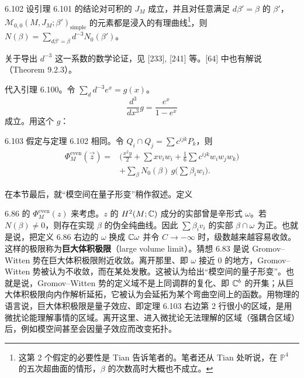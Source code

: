 \begin{theorem}{6.102}
  设引理 6.101 的结论对可积的 $J_M$ 成立，并且对任意满足 $d\beta'=\beta$ 的 $\beta'$，$\mathcal{M}_{0,0}(M,J_M;\beta')_{\mathrm{simple}}$ 的元素都是浸入的有理曲线\footnote{这第 2 个假定的必要性是 Tian 告诉笔者的。笔者还从 Tian 处听说，在 $\mathbb{P}^4$ 的五次超曲面的情形，$\beta$ 的次数高时大概也不成立。}，则 $N(\beta)=\sum_{d\beta'=\beta}d^{-3}N_0(\beta')$。
\end{theorem}

关于导出 $d^{-3}$ 这一系数的数学论证，见 [233], [241] 等。[64] 中也有解说（Theorem 9.2.3）。

代入引理 6.100。令 $\sum_d d^{-3}e^x=g(x)$。
\[
  \frac{d^3}{dx^3}g=\frac{e^x}{1-e^x}
\]
成立。用这个 $g$：

\begin{theorem}{6.103}
  假定与定理 6.102 相同。令 $Q_i\cap Q_j=\sum c^{ijk}P_k$，则
  \[
  \begin{aligned}
    \Phi_M^{\mathrm{even}}(\vec z)
    ={}&\Big(\frac{x^2y}{2}+\sum xv_iw_i+\frac16\sum c^{ijk}w_iw_jw_k\Big)\\
    &+\sum_\beta N_0(\beta)\,g\Big(\sum\beta_iw_i\Big).
  \end{aligned}
  \]
\end{theorem}


在本节最后，就“模空间在量子形变”稍作叙述。定义

6.86 的 $\Phi_M^{\mathrm{even}}(z)$ 来考虑。$z$ 的 $H^2(M;\mathbb{C})$ 成分的实部曾是辛形式 $\omega$。若 $N(\beta)\ne0$，则存在实现 $\beta$ 的伪全纯曲线。因此 $\sum\beta_iv_i$ 的实部 $\beta\cap\omega$ 为正。也就是说，把定义 6.86 右边的 $\omega$ 换成 $\mathbb{C}\omega$ 并令 $C\to-\infty$ 时，级数越来越容易收敛。这样的极限称为\textbf{巨大体积极限}（large volume limit）。猜想 6.83 是说 Gromov–Witten 势在巨大体积极限附近收敛。离开那里、即 $\omega$ 接近 $0$ 的地方，Gromov–Witten 势被认为不收敛，而在某处发散。这被认为给出“模空间的量子形变”。也就是说，Gromov–Witten 势的定义域不是上同调群的复化、即 $\mathbb{C}^b$ 的开集；从巨大体积极限向内作解析延拓，它被认为会延拓为某个弯曲空间上的函数。用物理的语言说，巨大体积极限是量子效应、即定理 6.103 右边第 2 行很小的区域，是用微扰论能理解事情的区域。离开这里、进入微扰论无法理解的区域（强耦合区域）后，例如模空间甚至会因量子效应而改变拓扑。

